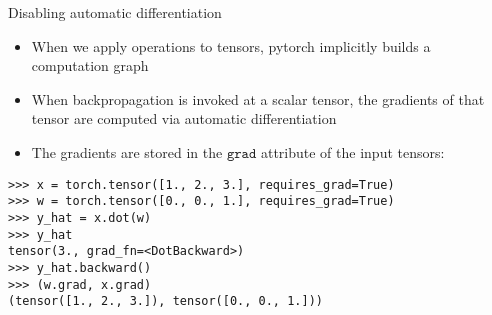 \begin{vbframe}{Disabling automatic differentiation}

\begin{itemize}
	\item When we apply operations to tensors, pytorch implicitly builds a computation graph
	\item When backpropagation is invoked at a scalar tensor, the gradients of that tensor are computed via automatic differentiation
	\item The gradients are stored in the $\texttt{grad}$ attribute of the input tensors:
\end{itemize}
\begin{verbatim}
>>> x = torch.tensor([1., 2., 3.], requires_grad=True)
>>> w = torch.tensor([0., 0., 1.], requires_grad=True)
>>> y_hat = x.dot(w)
>>> y_hat
tensor(3., grad_fn=<DotBackward>)
>>> y_hat.backward()
>>> (w.grad, x.grad)
(tensor([1., 2., 3.]), tensor([0., 0., 1.]))
\end{verbatim}

\end{vbframe}

